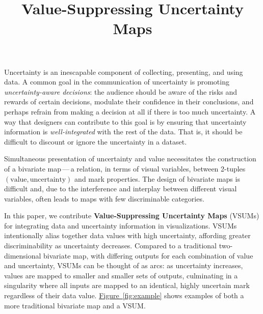 \documentclass{vgtc}                          %
\title{Value-Suppressing Uncertainty Maps}
\newcommand{\figref}[1]{\hyperref[#1]{Figure~\ref*{#1}}}
\begin{document}


\maketitle




Uncertainty is an inescapable component of collecting, presenting, and using data. A common goal in the communication of uncertainty is promoting \emph{uncertainty-aware decisions}: the audience should be aware of the risks and rewards of certain decisions, modulate their confidence in their conclusions, and perhaps refrain from making a decision at all if there is too much uncertainty.  A way that designers can contribute to this goal is by ensuring that uncertainty information is \emph{well-integrated} with the rest of the data. That is, it should be difficult to discount or ignore the uncertainty in a dataset.

Simultaneous presentation of uncertainty and value necessitates the construction of a bivariate map\,---\,a relation, in terms of visual variables, between 2-tuples $(\text{value}, \text{uncertainty})$ and mark properties. The design of bivariate maps is difficult and, due to the interference and interplay between different visual variables, often leads to maps with few discriminable categories.

In this paper, we contribute \textbf{Value-Suppressing Uncertainty Maps} (VSUMs) for integrating data and uncertainty information in visualizations. VSUMs intentionally alias together data values with high uncertainty, affording greater discriminability as uncertainty decreases. Compared to a traditional two-dimensional bivariate map, with differing outputs for each combination of value and uncertainty, VSUMs can be thought of as arcs: as uncertainty increases, values are mapped to smaller and smaller sets of outputs, culminating in a singularity where all inputs are mapped to an identical, highly uncertain mark regardless of their data value. \figref{fig:example} shows examples of both a more traditional bivariate map and a VSUM.
\end{document}

